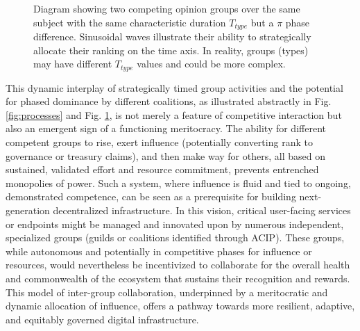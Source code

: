 \documentclass{article}
\begin{document}
\begin{CJK}{UTF8}{gbsn}
\begin{figure}[ht]
            \caption{Diagram showing two competing opinion groups over the same subject with the same characteristic duration $T_{type}$ but a $\pi$ phase difference. Sinusoidal waves illustrate their ability to strategically allocate their ranking on the time axis. In reality, groups (types) may have different $T_{type}$ values and could be more complex.
                \label{fig:processes-sinusoidal}}
        \end{figure}


        This dynamic interplay of strategically timed group activities and the potential for phased dominance by different coalitions, as illustrated abstractly in Fig. \ref{fig:processes} and Fig. \ref{fig:processes-sinusoidal}, is not merely a feature of competitive interaction but also an emergent sign of a functioning meritocracy. The ability for different competent groups to rise, exert influence (potentially converting rank to governance or treasury claims), and then make way for others, all based on sustained, validated effort and resource commitment, prevents entrenched monopolies of power. Such a system, where influence is fluid and tied to ongoing, demonstrated competence, can be seen as a prerequisite for building next-generation decentralized infrastructure. In this vision, critical user-facing services or endpoints might be managed and innovated upon by numerous independent, specialized groups (guilds or coalitions identified through ACIP). These groups, while autonomous and potentially in competitive phases for influence or resources, would nevertheless be incentivized to collaborate for the overall health and commonwealth of the ecosystem that sustains their recognition and rewards. This model of inter-group collaboration, underpinned by a meritocratic and dynamic allocation of influence, offers a pathway towards more resilient, adaptive, and equitably governed digital infrastructure.


\end{CJK}
\end{document}
